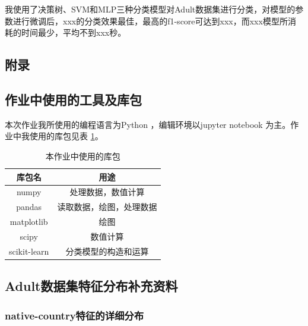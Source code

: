 \documentclass[12pt,a4paper]{article}
\theoremstyle{definition}
\begin{document}
\vspace{0.01\linewidth}
我使用了决策树、SVM和MLP三种分类模型对Adult数据集进行分类，对模型的参数进行微调后，xxx的分类效果最佳，最高的f1-score可达到xxx，而xxx模型所消耗的时间最少，平均不到xxx秒。
\newpage
\begin{appendix}
	\section{附录}
	\subsection{作业中使用的工具及库包}
	\label{apd:tools}
	本次作业我所使用的编程语言为Python \cite{python}，编辑环境以jupyter notebook \cite{notebook} 为主。作业中我使用的库包见表 \ref{tab:import}。
	
	\begin{table}[H]
		\renewcommand\arraystretch{1.35}
		\caption{本作业中使用的库包}
		\label{tab:import}
		\centering
		
		\begin{tabular}{c|c}
			\centering
			库包名 &  用途 \\
			\hline
	
			numpy \cite{numpy} & 处理数据，数值计算 \\
			pandas \cite{pandas} & 读取数据，绘图，处理数据 \\
			matplotlib \cite{matplotlib} & 绘图 \\
			scipy \cite{scipy} & 数值计算 \\
			scikit-learn \cite{sklearn} & 分类模型的构造和运算 \\
	
		\end{tabular}
	\end{table}
	
	\subsection{Adult数据集特征分布补充资料}
	
	\subsubsection{native-country特征的详细分布}
	\label{apd:native-country}
	

\end{appendix}
\end{document}

